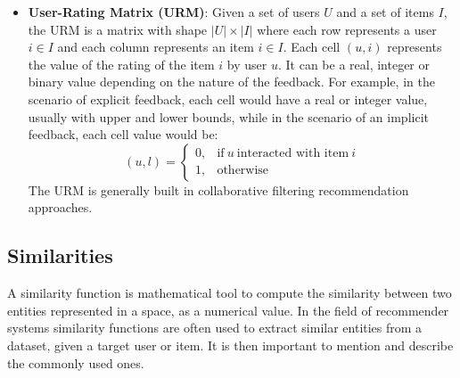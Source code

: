 \begin{itemize}
\item \textbf{User-Rating Matrix (URM)}: Given a set of users $U$ and a set of items $I$, the URM is a matrix with shape $|U| \times |I|$ where each row represents a user $i \in I$ and each column represents an item $i \in I$. Each cell $(u,i)$ represents the value of the rating of the item $i$ by user $u$. It can be a real, integer or binary value depending on the nature of the feedback. For example, in the scenario of explicit feedback, each cell would have a real or integer value, usually with upper and lower bounds, while in the scenario of an implicit feedback, each cell value would be:\\
\begin{equation}
  (u,l)=
  \begin{cases}
    0, & \text{if}\ u\ \text{interacted with item}\ i\\
    1, & \text{otherwise}
  \end{cases}
\end{equation}
The URM is generally built in collaborative filtering recommendation approaches.

\end{itemize}


\subsection{Similarities}

A similarity function is mathematical tool to compute the similarity between two entities represented in a space, as a numerical value. In the field of recommender systems similarity functions are often used to extract similar entities from a dataset, given a target user or item. It is then important to mention and describe the commonly used ones.

